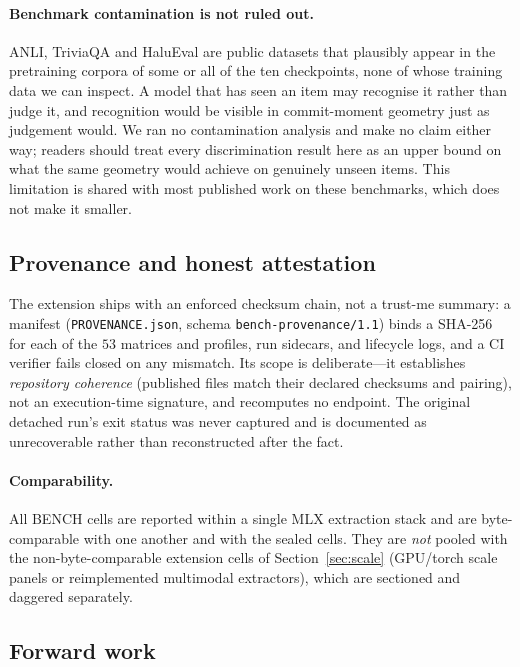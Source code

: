 \documentclass[11pt]{article}
\begin{document}
\paragraph{Benchmark contamination is not ruled out.} ANLI, TriviaQA and
HaluEval are public datasets that plausibly appear in the pretraining corpora
of some or all of the ten checkpoints, none of whose training data we can
inspect. A model that has seen an item may recognise it rather than judge it,
and recognition would be visible in commit-moment geometry just as judgement
would. We ran no contamination analysis and make no claim either way; readers
should treat every discrimination result here as an upper bound on what the
same geometry would achieve on genuinely unseen items. This limitation is
shared with most published work on these benchmarks, which does not make it
smaller.

\subsection{Provenance and honest attestation}

The extension ships with an enforced checksum chain, not a trust-me summary: a manifest
(\texttt{PROVENANCE.json}, schema \texttt{bench-provenance/1.1}) binds a SHA-256 for each of the $53$
matrices and profiles, run sidecars, and lifecycle logs, and a CI verifier fails closed on any
mismatch. Its scope is deliberate---it establishes \emph{repository coherence} (published files match
their declared checksums and pairing), not an execution-time signature, and recomputes no endpoint.
The original detached run's exit status was never captured and is documented as unrecoverable rather
than reconstructed after the fact.

\paragraph{Comparability.} All BENCH cells are reported within a single MLX extraction stack and
are byte-comparable with one another and with the sealed cells. They are \emph{not} pooled with the
non-byte-comparable extension cells of Section~\ref{sec:scale} (GPU/torch scale panels or
reimplemented multimodal extractors), which are sectioned and daggered separately.

\subsection{Forward work}
\label{sec:forward}
\end{document}
